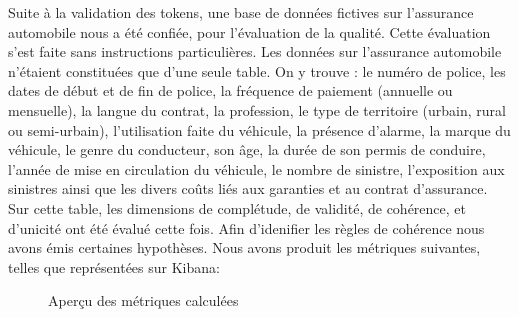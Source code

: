 Suite \`a la validation des tokens, une base de donn\'ees fictives sur l'assurance automobile nous a \'et\'e confi\'ee, pour l'\'evaluation de la qualit\'e. Cette \'evaluation s'est faite sans instructions particuli\`eres. Les donn\'ees sur l'assurance automobile n'\'etaient constituées que d'une seule table. On y trouve : le num\'ero de police, les dates de d\'ebut et de fin de police, la fr\'equence de paiement (annuelle ou mensuelle), la langue du contrat, la profession, le type de territoire (urbain, rural ou semi-urbain), l'utilisation faite du v\'ehicule,  la pr\'esence d'alarme, la marque du v\'ehicule, le genre du conducteur, son \^age, la dur\'ee de son permis de conduire, l'ann\'ee de mise en circulation du v\'ehicule, le nombre de sinistre, l'exposition aux sinistres ainsi que les divers co\^uts li\'es aux garanties et au contrat d'assurance. Sur cette table, les dimensions de complétude, de validité, de cohérence, et d’unicité ont \'et\'e \'evalu\'e cette fois. Afin d'idenifier les r\`egles de coh\'erence nous avons \'emis certaines hypoth\`eses. Nous avons produit les m\'etriques suivantes, telles que repr\'esent\'ees sur Kibana: 
\begin{figure}[!htp]
    \caption{Aperçu des m\'etriques calcul\'ees }  \label{fig:edge34}
  \begin{center}
  
  \end{center}
\end{figure}
